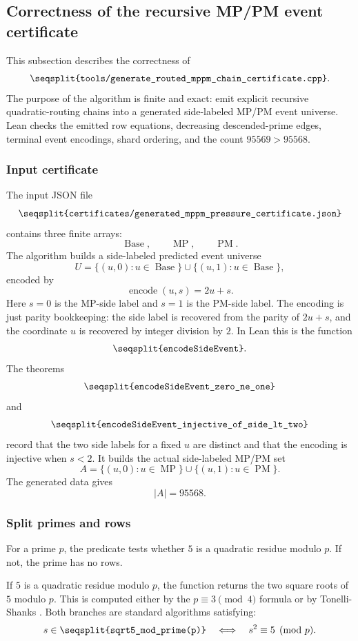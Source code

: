 \documentclass[11pt]{article}
\newcommand{\Lean}[1]{\texttt{\seqsplit{#1}}}
\newcommand{\Code}[1]{\texttt{\seqsplit{#1}}}
\begin{document}
\subsection{Correctness of the recursive MP/PM event certificate}
\label{sec:events}

This subsection describes the correctness of
\[
  \Code{tools/generate\_routed\_mppm\_chain\_certificate.cpp}.
\]
The purpose of the algorithm is finite and exact: emit explicit recursive
quadratic-routing chains into a generated side-labeled MP/PM event universe.
Lean checks the emitted row equations, decreasing descended-prime edges,
terminal event encodings, shard ordering, and the count \(95569>95568\).

\subsubsection{Input certificate}

The input JSON file
\[
  \Code{certificates/generated\_mppm\_pressure\_certificate.json}
\]
contains three finite arrays:
\[
  \operatorname{Base},\qquad \operatorname{MP},\qquad \operatorname{PM}.
\]
The algorithm builds a side-labeled predicted event universe
\[
  U=\{(u,0):u\in\operatorname{Base}\}
    \cup
    \{(u,1):u\in\operatorname{Base}\},
\]
encoded by
\[
  \operatorname{encode}(u,s)=2u+s.
\]
Here \(s=0\) is the MP-side label and \(s=1\) is the PM-side label.  The
encoding is just parity bookkeeping: the side label is recovered from the
parity of \(2u+s\), and the coordinate \(u\) is recovered by integer division
by \(2\).  In Lean this is the function
\[
  \Lean{encodeSideEvent}.
\]
The theorems
\[
  \Lean{encodeSideEvent\_zero\_ne\_one}
\]
and
\[
  \Lean{encodeSideEvent\_injective\_of\_side\_lt\_two}
\]
record that the two side labels for a fixed \(u\) are distinct and that the
encoding is injective when \(s<2\).
It builds the actual side-labeled MP/PM set
\[
  A=\{(u,0):u\in\operatorname{MP}\}
    \cup
    \{(u,1):u\in\operatorname{PM}\}.
\]
The generated data gives
\[
  |A|=95568.
\]

\subsubsection{Split primes and rows}

For a prime \(p\), the predicate \Code{leg5(p)} tests whether \(5\) is a
quadratic residue modulo \(p\).  If not, the prime has no rows.

If \(5\) is a quadratic residue modulo \(p\), the function
\Code{sqrt5\_mod\_prime(p)} returns the two square roots of \(5\) modulo
\(p\).  This is computed either by the \(p\equiv 3\pmod 4\) formula or by
Tonelli-Shanks \cite{Shanks1973}.  Both branches are standard algorithms
satisfying:
\[
  s\in\Code{sqrt5\_mod\_prime(p)}
  \quad\Longleftrightarrow\quad
  s^2\equiv 5\pmod p.
\]
\end{document}
